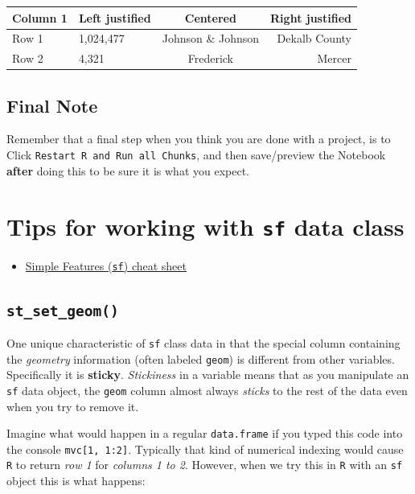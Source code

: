 \documentclass[
]{book}
\providecommand{\tightlist}{%
  \setlength{\itemsep}{0pt}\setlength{\parskip}{0pt}}
\begin{document}
\begin{longtable}[]{@{}llcr@{}}
\toprule\noalign{}
Column 1 & Left justified & Centered & Right justified \\
\midrule\noalign{}
\endhead
\bottomrule\noalign{}
\endlastfoot
Row 1 & 1,024,477 & Johnson \& Johnson & Dekalb County \\
Row 2 & 4,321 & Frederick & Mercer \\
\end{longtable}

\hypertarget{final-note}{%
\section{Final Note}\label{final-note}}

Remember that a final step when you think you are done with a project, is to Click \texttt{Restart\ R\ and\ Run\ all\ Chunks}, and then save/preview the Notebook \textbf{after} doing this to be sure it is what you expect.

\hypertarget{sf-overview}{%
\chapter{\texorpdfstring{Tips for working with \texttt{sf} data class}{Tips for working with sf data class}}\label{sf-overview}}

\begin{itemize}
\tightlist
\item
  \href{https://github.com/rstudio/cheatsheets/blob/main/sf.pdf}{Simple Features (\texttt{sf}) cheat sheet}
\end{itemize}

\hypertarget{st_set_geom}{%
\section{\texorpdfstring{\texttt{st\_set\_geom()}}{st\_set\_geom()}}\label{st_set_geom}}

One unique characteristic of \texttt{sf} class data in that the special column containing the \emph{geometry} information (often labeled \texttt{geom}) is different from other variables. Specifically it is \textbf{sticky}. \emph{Stickiness} in a variable means that as you manipulate an \texttt{sf} data object, the \texttt{geom} column almost always \emph{sticks} to the rest of the data even when you try to remove it.

Imagine what would happen in a regular \texttt{data.frame} if you typed this code into the console \texttt{mvc{[}1,\ 1:2{]}}. Typically that kind of numerical indexing would cause \texttt{R} to return \emph{row 1} for \emph{columns 1 to 2}. However, when we try this in \texttt{R} with an \texttt{sf} object this is what happens:
\end{document}
